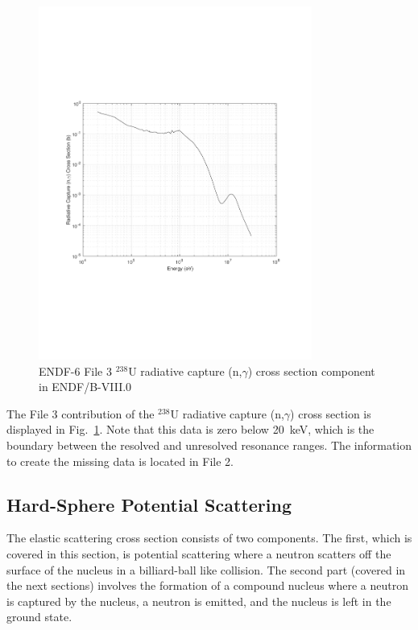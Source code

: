 \begin{figure}[tb!]
\begin{center}
\includegraphics[trim={3.75cm 6.75cm 3.75cm 6.75cm}, width=0.8\textwidth]{./Figures/u238_ngammaXS_mf3.pdf}
\caption{ENDF-6 File 3 $^{238}$U radiative capture (n,$\gamma$) cross section component in ENDF/B-VIII.0}
\label{Fig:libraryGeneration_u238_captureXS_MF3}
\end{center}
\end{figure}

The File 3 contribution of the $^{238}$U radiative capture (n,$\gamma$) cross section is displayed in Fig.~\ref{Fig:libraryGeneration_u238_captureXS_MF3}. Note that this data is zero below 20~keV, which is the boundary between the resolved and unresolved resonance ranges. The information to create the missing data is located in File 2.

\subsection{Hard-Sphere Potential Scattering}

The elastic scattering cross section consists of two components. The first, which is covered in this section, is potential scattering where a neutron scatters off the surface of the nucleus in a billiard-ball like collision. The second part (covered in the next sections) involves the formation of a compound nucleus where a neutron is captured by the nucleus, a neutron is emitted, and the nucleus is left in the ground state.

